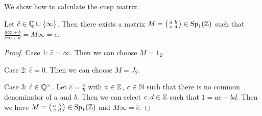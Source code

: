 We show how to calculate the cusp matrix.
\begin{lemma}
\label{lemma:cuspmatrixMc}
Let $\hat{c} \in \Q \cup \Set{\infty}$. Then there exists a matrix $M = \left( \begin{smallmatrix} a & b \\ c & d \end{smallmatrix} \right) \in \operatorname{Sp}_1(\mathbb{Z})$ such that $\frac{a \infty + b}{c \infty + d} = M \infty = c$. 
\begin{proof}
Case 1: $\hat{c} = \infty$. Then we can choose $M = 1_2$.

Case 2: $\hat{c} = 0$. Then we can choose $M = J_2$.

Case 3: $\hat{c} \in \mathbb{Q}^\times$. Let $\hat{c} = \frac{a}{b}$ with $a \in \mathbb{Z}$, $c \in \mathbb{N}$ such that there is no common denominator of $a$ and $b$. Then we can select $c, d \in \mathbb{Z}$ such that $1 = a c - b d$. Then we have $M = \left( \begin{smallmatrix} a & b \\ c & d \end{smallmatrix} \right) \in \operatorname{Sp}_1(\mathbb{Z})$ and $M \infty = \hat{c}$.
\end{proof}
\end{lemma}

